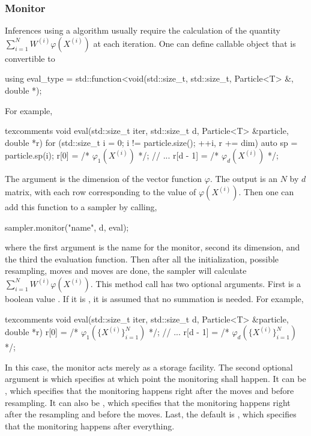 \documentclass[11pt,bib,mint,hyper,altcolor]{marticle}
\begin{document}
\subsubsection{Monitor}
\label{ssub:Monitor}

Inferences using a \smc algorithm usually require the calculation of the
quantity $\sum_{i=1}^NW^{(i)}\varphi(X^{(i)})$ at each iteration. One can
define callable object that is convertible to
\begin{cppcode}
  using eval_type =
      std::function<void(std::size_t, std::size_t, Particle<T> &, double *);
\end{cppcode}
For example,
\begin{cppcode*}{texcomments}
  void eval(std::size_t iter, std::size_t d, Particle<T> &particle, double *r)
  {
      for (std::size_t i = 0; i != particle.size(); ++i, r += dim) {
          auto sp = particle.sp(i);
          r[0] = /* $\varphi_1(X^{(i)})$ */;
          // ...
          r[d - 1] = /* $\varphi_d(X^{(i)})$ */;
      }
  }
\end{cppcode*}
The argument  is the dimension of the vector function $\varphi$.
The output is an $N$ by $d$ matrix, with each row corresponding to the value of
$\varphi(X^{(i)})$. Then one can add this function to a sampler by calling,
\begin{cppcode}
  sampler.monitor("name", d, eval);
\end{cppcode}
where the first argument is the name for the monitor, second its dimension, and
the third the evaluation function. Then after all the initialization, possible
resampling, moves and \mcmc moves are done, the sampler will calculate
$\sum_{i=1}^NW^{(i)}\varphi(X^{(i)})$. This method call has two optional
arguments. First is a boolean value . If it is
, it is assumed that no summation is needed. For example,
\begin{cppcode*}{texcomments}
  void eval(std::size_t iter, std::size_t d, Particle<T> &particle, double *r)
  {
      r[0] = /* $\varphi_1(\{X^{(i)}\}_{i=1}^N)$ */;
      // ...
      r[d - 1] = /* $\varphi_d(\{X^{(i)}\}_{i=1}^N)$ */;
  }
\end{cppcode*}
In this case, the monitor acts merely as a storage facility. The second
optional argument is  which specifies at which point the
monitoring shall happen. It can be , which specifies
that the monitoring happens right after the moves and before resampling. It can
also be , which specifies that the monitoring
happens right after the resampling and before the \mcmc moves. Last, the
default is , which specifies that the monitoring happens
after everything.
\end{document}
